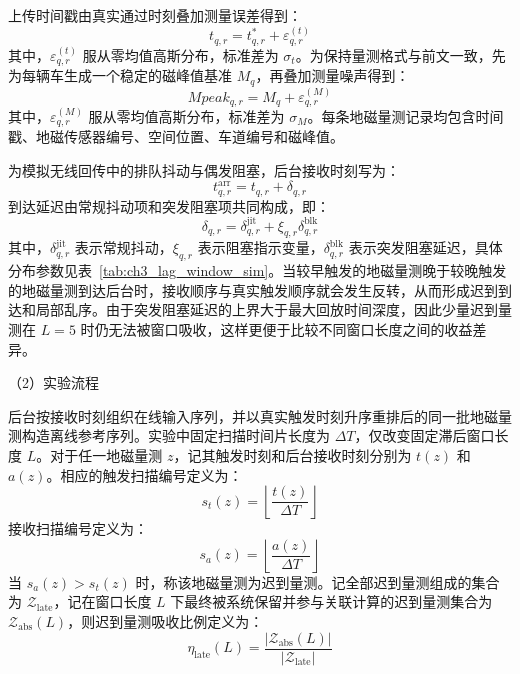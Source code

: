 \documentclass{xdupgthesis}
\begin{document}
上传时间戳由真实通过时刻叠加测量误差得到：
\begin{equation}
	t_{q,r}
	=
	t_{q,r}^{\ast}+\varepsilon_{q,r}^{(t)}
\end{equation}
其中，$\varepsilon_{q,r}^{(t)}$ 服从零均值高斯分布，标准差为 $\sigma_t$。为保持量测格式与前文一致，先为每辆车生成一个稳定的磁峰值基准 $M_q$，再叠加测量噪声得到：
\begin{equation}
	Mpeak_{q,r}
	=
	M_q+\varepsilon_{q,r}^{(M)}
\end{equation}
其中，$\varepsilon_{q,r}^{(M)}$ 服从零均值高斯分布，标准差为 $\sigma_M$。每条地磁量测记录均包含时间戳、地磁传感器编号、空间位置、车道编号和磁峰值。

为模拟无线回传中的排队抖动与偶发阻塞，后台接收时刻写为：
\begin{equation}
	t_{q,r}^{\mathrm{arr}}
	=
	t_{q,r}+\delta_{q,r}
\end{equation}
到达延迟由常规抖动项和突发阻塞项共同构成，即：
\begin{equation}
	\delta_{q,r}
	=
	\delta_{q,r}^{\mathrm{jit}}+\xi_{q,r}\delta_{q,r}^{\mathrm{blk}}
\end{equation}
其中，$\delta_{q,r}^{\mathrm{jit}}$ 表示常规抖动，$\xi_{q,r}$ 表示阻塞指示变量，$\delta_{q,r}^{\mathrm{blk}}$ 表示突发阻塞延迟，具体分布参数见表~\ref{tab:ch3_lag_window_sim}。当较早触发的地磁量测晚于较晚触发的地磁量测到达后台时，接收顺序与真实触发顺序就会发生反转，从而形成迟到到达和局部乱序。由于突发阻塞延迟的上界大于最大回放时间深度，因此少量迟到量测在 $L=5$ 时仍无法被窗口吸收，这样更便于比较不同窗口长度之间的收益差异。

\noindent （2）实验流程

后台按接收时刻组织在线输入序列，并以真实触发时刻升序重排后的同一批地磁量测构造离线参考序列。实验中固定扫描时间片长度为 $\Delta T$，仅改变固定滞后窗口长度 $L$。对于任一地磁量测 $z$，记其触发时刻和后台接收时刻分别为 $t(z)$ 和 $a(z)$。相应的触发扫描编号定义为：
\begin{equation}
	s_t(z)
	=
	\left\lfloor\frac{t(z)}{\Delta T}\right\rfloor
\end{equation}
接收扫描编号定义为：
\begin{equation}
	s_a(z)
	=
	\left\lfloor\frac{a(z)}{\Delta T}\right\rfloor
\end{equation}
当 $s_a(z)>s_t(z)$ 时，称该地磁量测为迟到量测。记全部迟到量测组成的集合为 $\mathcal Z_{\mathrm{late}}$，记在窗口长度 $L$ 下最终被系统保留并参与关联计算的迟到量测集合为 $\mathcal Z_{\mathrm{abs}}(L)$，则迟到量测吸收比例定义为：
\begin{equation}
	\eta_{\mathrm{late}}(L)
	=
	\frac{\left|\mathcal Z_{\mathrm{abs}}(L)\right|}{\left|\mathcal Z_{\mathrm{late}}\right|}
\end{equation}
\end{document}
